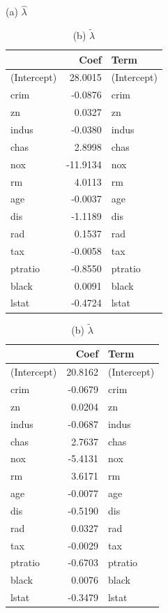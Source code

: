 \documentclass[12pt, a4paper, oneside]{ctexart}
\begin{document}
\begin{appendices}
\begin{table}[htbp]
			\begin{minipage}{0.48\textwidth}
				\centering
				\caption*{(a) $\hat{\lambda}$}
				\begin{tabular}{l r l}
					\toprule
					& Coef & Term \\
					\midrule
					(Intercept) & 28.0015 & (Intercept)\\
					crim & -0.0876 & crim\\
					zn & 0.0327 & zn\\
					indus & -0.0380 & indus\\
					chas & 2.8998 & chas\\
					nox & -11.9134 & nox\\
					rm & 4.0113 & rm\\
					age & -0.0037 & age\\
					dis & -1.1189 & dis\\
					rad & 0.1537 & rad\\
					tax & -0.0058 & tax\\
					ptratio & -0.8550 & ptratio\\
					black & 0.0091 & black\\
					lstat & -0.4724 & lstat\\
					\bottomrule
				\end{tabular}
			\end{minipage}
			\hfill
			\begin{minipage}{0.48\textwidth}
				\centering
				\caption*{(b) $\tilde{\lambda}$}
				\begin{tabular}{l r l}
					\toprule
					& Coef & Term \\
					\midrule
					(Intercept) & 20.8162 & (Intercept)\\
					crim & -0.0679 & crim\\
					zn & 0.0204 & zn\\
					indus & -0.0687 & indus\\
					chas & 2.7637 & chas\\
					nox & -5.4131 & nox\\
					rm & 3.6171 & rm\\
					age & -0.0077 & age\\
					dis & -0.5190 & dis\\
					rad & 0.0327 & rad\\
					tax & -0.0029 & tax\\
					ptratio & -0.6703 & ptratio\\
					black & 0.0076 & black\\
					lstat & -0.3479 & lstat\\
					\bottomrule
				\end{tabular}
			\end{minipage}
			

\end{table}
\end{appendices}
\end{document}
